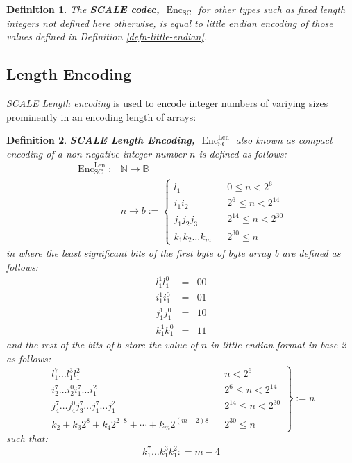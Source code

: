 \documentclass{book}
\newcommand{\assign}{:=}
\newcommand{\cdummy}{\cdot}
\newcommand{\nosymbol}{}
\newcommand{\tmem}[1]{{\em #1\/}}
\newcommand{\tmop}[1]{\ensuremath{\operatorname{#1}}}
\newcommand{\tmstrong}[1]{\textbf{#1}}
\newtheorem{definition}{Definition}
\newtheorem{definition}{Definition}
\begin{document}
\begin{definition}
  The {\tmstrong{SCALE codec, $\tmop{Enc}_{\tmop{SC}}$}} for other types such
  as fixed length integers not defined here otherwise, is equal to little
  endian encoding of those values defined in Definition
  \ref{defn-little-endian}. 
\end{definition}

\subsection{Length Encoding}\label{sect-int-encoding}

{\tmem{SCALE Length encoding}} is used to encode integer numbers of variying
sizes prominently in an encoding length of arrays:

\begin{definition}
  \label{defn-sc-len-encoding}{\tmstrong{SCALE Length Encoding,
  $\tmop{Enc}^{\tmop{Len}}_{\tmop{SC}}$}} also known as compact encoding of a
  non-negative integer number $n$ is defined as follows:
  \[ \begin{array}{ll}
       \tmop{Enc}^{\tmop{Len}}_{\tmop{SC}} : & \mathbb{N} \rightarrow
       \mathbb{B}\\
       & n \rightarrow b \assign \left\{ \begin{array}{lll}
         l^{\nosymbol}_1 &  & 0 \leqslant n < 2^6\\
         i^{\nosymbol}_1 i^{\nosymbol}_2 &  & 2^6 \leqslant n < 2^{14}\\
         j^{\nosymbol}_1 j^{\nosymbol}_2 j_3 &  & 2^{14} \leqslant n <
         2^{30}\\
         k_1^{\nosymbol} k_2^{\nosymbol} \ldots k_m^{\nosymbol}  &  & 2^{30}
         \leqslant n
       \end{array} \right.
     \end{array} \]
  in where the least significant bits of the first byte of byte array b are
  defined as follows:
  \[ \begin{array}{lcc}
       l^1_1 l_1^0 & = & 00\\
       i^1_1 i_1^0 & = & 01\\
       j^1_1 j_1^0 & = & 10\\
       k^1_1 k_1^0 & = & 11
     \end{array} \]
  and the rest of the bits of $b$ store the value of $n$ in little-endian
  format in base-2 as follows:
  \[ \left. \begin{array}{lll}
       l^7_1 \ldots l^3_1 l^2_1 &  & n < 2^6\\
       i_2^7 \ldots i_2^0 i_1^7 \ldots i^2_1^{\nosymbol} &  & 2^6 \leqslant n
       < 2^{14}\\
       j_4^7 \ldots j_4^0 j_3^7 \ldots j_1^7 \ldots j^2_1 &  & 2^{14}
       \leqslant n < 2^{30}\\
       k_2 + k_3 2^8 + k_4 2^{2 \cdummy 8} + \cdots + k_m 2^{(m - 2) 8} &  &
       2^{30} \leqslant n
     \end{array} \right\} \assign n \]
  such that:
  \[ k^7_1 \ldots k^3_1 k^2_1 : = m - 4 \]
\end{definition}
\end{document}
